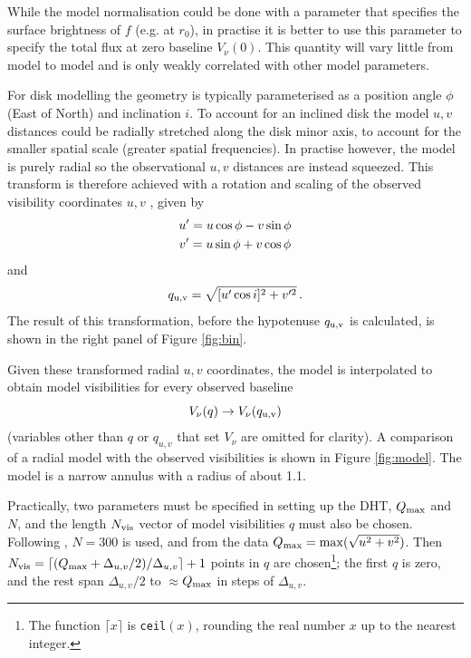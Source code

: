 \documentclass[fleqn,usenatbib]{rasti}
\begin{document}
While the model normalisation could be done with a parameter that specifies the surface brightness of $f$ (e.g. at $r_0$), in practise it is better to use this parameter to specify the total flux at zero baseline $V_\nu(0)$. This quantity will vary little from model to model and is only weakly correlated with other model parameters.

For disk modelling the geometry is typically parameterised as a position angle $\phi$ (East of North) and inclination $i$. To account for an inclined disk the model $u,v$ distances could be radially stretched along the disk minor axis, to account for the smaller spatial scale (greater spatial frequencies). In practise however, the model is purely radial so the observational $u,v$ distances are instead squeezed. This transform is therefore achieved with a rotation and scaling of the observed visibility coordinates $u,v$ \citep[e.g. as in][]{2018MNRAS.476.4527T}, given by
\begin{gather}
    u' = u \cos \phi - v \sin \phi \notag \\
    v' = u \sin \phi + v \cos \phi
\end{gather}
and 
\begin{equation}\label{eq:trans}
    q_{\rm u,v} = \sqrt{[u' \cos i]^2 + v'^2} \, .
\end{equation}
The result of this transformation, before the hypotenuse $q_{\rm u,v}$ is calculated, is shown in the right panel of Figure \ref{fig:bin}.

Given these transformed radial $u,v$ coordinates, the model is interpolated to obtain model visibilities for every observed baseline
\begin{equation}
    V_\nu(q) \rightarrow V_\nu(q_{\rm u,v})
\end{equation}
(variables other than $q$ or $q_{u,v}$ that set $V_\nu$ are omitted for clarity). A comparison of a radial model with the observed visibilities is shown in Figure \ref{fig:model}. The model is a narrow annulus with a radius of about 1.1\arcsec.

Practically, two parameters must be specified in setting up the DHT, $Q_{\rm max}$ and $N$, and the length $N_{\rm vis}$ vector of model visibilities $q$ must also be chosen. Following \citet{2020MNRAS.tmp.1491J}, $N=300$ is used, and from the data $Q_{\rm max} = \max(\sqrt{u^2+v^2})$. Then $N_{\rm vis} = \lceil (Q_{\rm max}+\Delta_{u,v}/2)/\Delta_{u,v} \rceil + 1$ points in $q$ are chosen\footnote{The function $\lceil x \rceil$ is \texttt{ceil}$(x)$, rounding the real number $x$ up to the nearest integer.}; the first $q$ is zero, and the rest span $\Delta_{u,v}/2$ to $\approx$$Q_{\rm max}$ in steps of $\Delta_{u,v}$.
\end{document}
